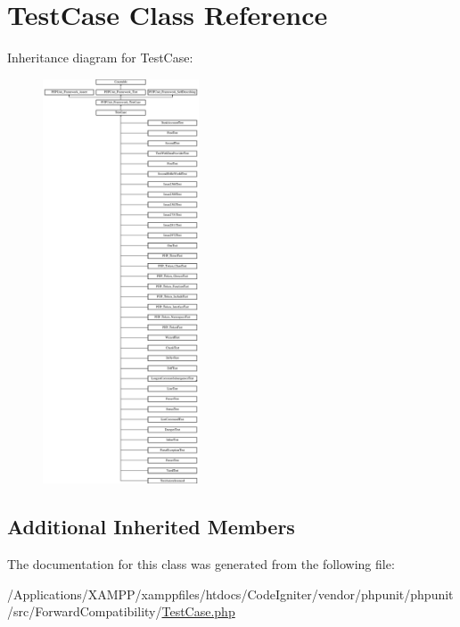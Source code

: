 \hypertarget{class_p_h_p_unit_1_1_framework_1_1_test_case}{}\section{Test\+Case Class Reference}
\label{class_p_h_p_unit_1_1_framework_1_1_test_case}
Inheritance diagram for Test\+Case\+:\begin{figure}[H]
\begin{center}
\leavevmode
\includegraphics[height=12.000000cm]{class_p_h_p_unit_1_1_framework_1_1_test_case}
\end{center}
\end{figure}
\subsection*{Additional Inherited Members}


The documentation for this class was generated from the following file\+:\begin{DoxyCompactItemize}
\item 
/\+Applications/\+X\+A\+M\+P\+P/xamppfiles/htdocs/\+Code\+Igniter/vendor/phpunit/phpunit/src/\+Forward\+Compatibility/\mbox{\hyperlink{phpunit_2src_2_forward_compatibility_2_test_case_8php}{Test\+Case.\+php}}\end{DoxyCompactItemize}
